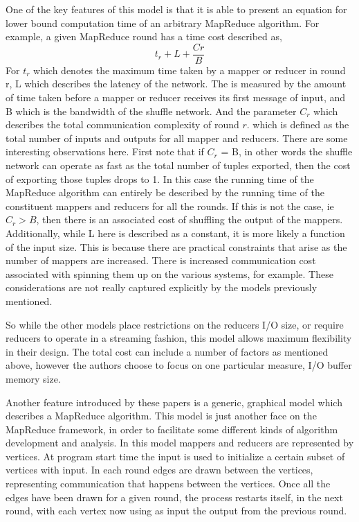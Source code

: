\documentclass{article}
\begin{document}
One of the key features of this model is that it is able to present an equation for lower bound computation time of an arbitrary MapReduce algorithm. For example, a given MapReduce round has a time cost described as,
\[
t_r + L + \frac{Cr}{B}
\]
For $t_r$ which denotes the maximum time taken by a mapper or reducer in round r, L which describes  the latency of the network. The is measured by the amount of time taken before a mapper or reducer receives its first message of input, and B which is the bandwidth of the shuffle network. And the parameter $C_r$ which describes the total communication complexity of round $r$. which is defined as the total number of inputs and outputs for all mapper and reducers. There are some interesting observations here. First note that if $C_r$ = B, in other words the shuffle network can operate as fast as the total number of tuples exported, then the cost of exporting those tuples drops to 1. In this case the running time of the MapReduce algorithm can entirely be described by the running time of the constituent mappers and reducers for all the rounds. If this is not the case, ie $C_r > B$, then there is an associated cost of shuffling the output of the mappers. Additionally, while L here is described as a constant, it is more likely a function of the input size. This is because there are practical constraints that arise as the number of mappers are increased. There is increased communication cost associated with spinning them up on the various systems, for example. These considerations are not really captured explicitly by the models previously mentioned. 

So while the other models place restrictions on the reducers I/O size, or require reducers to operate in a streaming fashion, this model allows maximum flexibility in their design. The total cost can include a number of factors as mentioned above, however the authors choose to focus on one particular measure, I/O buffer memory size.

Another feature introduced by these papers is a generic, graphical model which describes a MapReduce algorithm. This model is just another face on the MapReduce framework, in order to facilitate some different kinds of algorithm development and analysis. In this model mappers and reducers are represented by vertices. At program start time the input is used to initialize a certain subset of vertices with input. In each round edges are drawn between the vertices, representing communication that happens between the vertices. Once all the edges have been drawn for a given round, the process restarts itself, in the next round, with each vertex now using as input the output from the previous round. 
\end{document}
